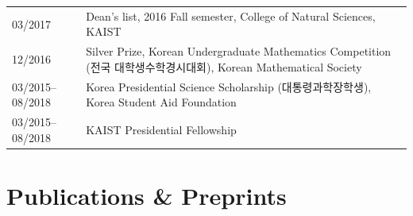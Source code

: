 \documentclass[a4paper, 10pt]{article}
\begin{document}
\begin{tabular}{Q{2.45cm}P{13cm}}
\small{03/2017} & Dean's list, 2016 Fall semester, College of Natural Sciences, KAIST\\\small{12/2016} & 
Silver Prize, Korean Undergraduate Mathematics Competition (전국 대학생수학경시대회), Korean Mathematical Society
\\
\small{03/2015–08/2018} & Korea Presidential Science Scholarship (대통령과학장학생), Korea Student Aid Foundation\\
\small{03/2015–08/2018} & KAIST Presidential Fellowship\\
\end{tabular}


\section{Publications \& Preprints}
\vspace{5pt}
\end{document}

